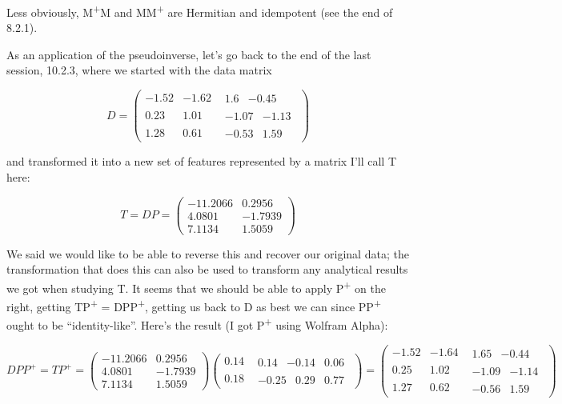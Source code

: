 \documentclass[oneside,english]{amsbook}
\numberwithin{section}{chapter}
\theoremstyle{plain}
\theoremstyle{definition}
\begin{document}
Less obviously, M\textsuperscript{+}M and MM\textsuperscript{+} are
Hermitian and idempotent (see the end of 8.2.1).

As an application of the pseudoinverse, let's go back to the end of the
last session, 10.2.3, where we started with the data matrix

\[D = \begin{pmatrix}
	- 1.52 & - 1.62 & \begin{matrix}
		1.6 & - 0.45
	\end{matrix} \\
	0.23 & 1.01 & \begin{matrix}
		- 1.07 & - 1.13
	\end{matrix} \\
	1.28 & 0.61 & \begin{matrix}
		- 0.53 & 1.59
	\end{matrix}
\end{pmatrix}\]

and transformed it into a new set of features represented by a matrix
I'll call T here:

\[{T = DP
}{= \begin{pmatrix}
		- 11.2066 & 0.2956 \\
		4.0801 & - 1.7939 \\
		7.1134 & 1.5059
\end{pmatrix}}\]

We said we would like to be able to reverse this and recover our
original data; the transformation that does this can also be used to
transform any analytical results we got when studying T. It seems that
we should be able to apply P\textsuperscript{+} on the right, getting
TP\textsuperscript{+} = DPP\textsuperscript{+}, getting us back to D as
best we can since PP\textsuperscript{+} ought to be ``identity-like''.
Here's the result (I got P\textsuperscript{+} using Wolfram Alpha):

\[{DPP^{+} = TP^{+}
}{= \begin{pmatrix}
		- 11.2066 & 0.2956 \\
		4.0801 & - 1.7939 \\
		7.1134 & 1.5059
	\end{pmatrix}\begin{pmatrix}
		0.14 & \begin{matrix}
			0.14 & - 0.14 & 0.06
		\end{matrix} \\
		0.18 & \begin{matrix}
			- 0.25 & 0.29 & 0.77
		\end{matrix}
	\end{pmatrix}
}{= \begin{pmatrix}
		- 1.52 & - 1.64 & \begin{matrix}
			1.65 & - 0.44
		\end{matrix} \\
		0.25 & 1.02 & \begin{matrix}
			- 1.09 & - 1.14
		\end{matrix} \\
		1.27 & 0.62 & \begin{matrix}
			- 0.56 & 1.59
		\end{matrix}
\end{pmatrix}}\]
\end{document}
